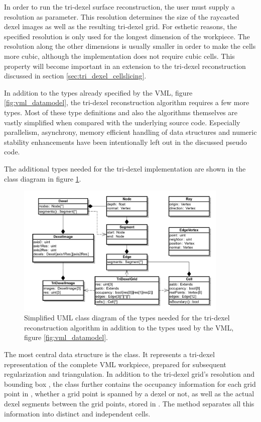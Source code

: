 In order to run the tri-dexel surface reconstruction, the user must supply a resolution as parameter.
This resolution determines the size of the raycasted dexel images as well as the resulting tri-dexel grid.
For esthetic reasons, the specified resolution is only used for the longest dimension of the workpiece.
The resolution along the other dimensions is usually smaller in order to make the cells more cubic, although the implementation does not require cubic cells.
This property will become important in an extension to the tri-dexel reconstruction discussed in section \ref{sec:tri_dexel_cellslicing}.


In addition to the types already specified by the VML, \cf figure \ref{fig:vml_datamodel}, the tri-dexel reconstruction algorithm requires a few more types.
Most of these type definitions and also the algorithms themselves are vastly simplified when compared with the underlying source code.
Especially parallelism, asynchrony, memory efficient handling of data structures and numeric stability enhancements have been intentionally left out in the discussed pseudo code.


The additional types needed for the tri-dexel implementation are shown in the class diagram in figure \ref{fig:tri_dexel_datamodel}.
%
\begin{figure}
	\centering
	\includegraphics[width=0.9\textwidth]{images/tri_dexel_datamodel}
	\caption{
		Simplified UML class diagram of the types needed for the tri-dexel reconstruction algorithm in addition to the types used by the VML, \cf figure \ref{fig:vml_datamodel}.
	}
	\label{fig:tri_dexel_datamodel}
\end{figure}
%
The most central data structure is the  class.
It represents a tri-dexel representation of the complete VML workpiece, prepared for subsequent regularization and triangulation.
In addition to the tri-dexel grid's resolution  and bounding box , the  class further contains the occupancy information for each grid point in , \ie whether a grid point is spanned by a dexel or not, as well as the actual dexel segments between the grid points, stored in .
The  method separates all this information into distinct and independent cells.

